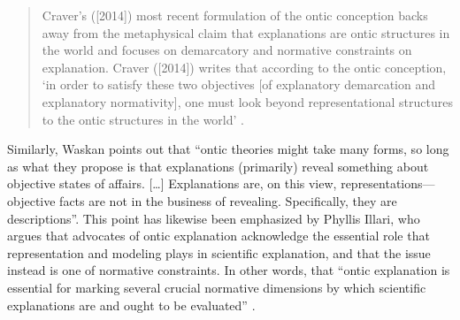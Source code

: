 \begin{quotation}
Craver's ([2014]) most recent formulation of the ontic conception backs away from the metaphysical claim that explanations are ontic structures in the world and focuses on demarcatory and normative constraints on explanation. Craver ([2014]) writes that according to the ontic conception, ‘in order to satisfy these two objectives [of explanatory demarcation and explanatory normativity], one must look beyond representational structures to the ontic structures in the world'
\parencite[][p.129]{povich_because_2018}.%


\end{quotation}
Similarly, Waskan
\parencite*[][p.4]{waskan_intelligibility_2011} %
 points out that ``ontic theories might take many forms, so long as what they propose is that explanations (primarily) reveal something about objective states of affairs. […] Explanations are, on this view, representations---objective facts are not in the business of revealing. Specifically, they are descriptions''. This point has likewise been emphasized by Phyllis Illari, who argues that advocates of ontic explanation acknowledge the essential role that representation and modeling plays in scientific explanation, and that the issue instead is one of normative constraints. In other words, that ``ontic explanation is essential for marking several crucial normative dimensions by which scientific explanations are and ought to be evaluated'' 
\parencite[][p.243]{illari_mechanistic_2013}.%
